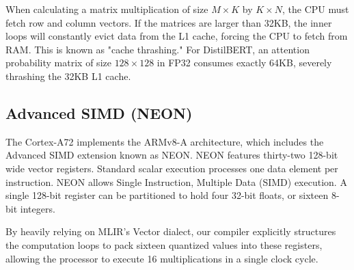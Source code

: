 When calculating a matrix multiplication of size $M \times K$ by $K \times N$, the CPU must fetch row and column vectors. If the matrices are larger than 32KB, the inner loops will constantly evict data from the L1 cache, forcing the CPU to fetch from RAM. This is known as "cache thrashing." For DistilBERT, an attention probability matrix of size $128 \times 128$ in FP32 consumes exactly 64KB, severely thrashing the 32KB L1 cache.

\subsection{Advanced SIMD (NEON)}
The Cortex-A72 implements the ARMv8-A architecture, which includes the Advanced SIMD extension known as NEON. NEON features thirty-two 128-bit wide vector registers. 
Standard scalar execution processes one data element per instruction. NEON allows Single Instruction, Multiple Data (SIMD) execution. A single 128-bit register can be partitioned to hold four 32-bit floats, or sixteen 8-bit integers. 

By heavily relying on MLIR's Vector dialect, our compiler explicitly structures the computation loops to pack sixteen quantized values into these registers, allowing the processor to execute 16 multiplications in a single clock cycle.


